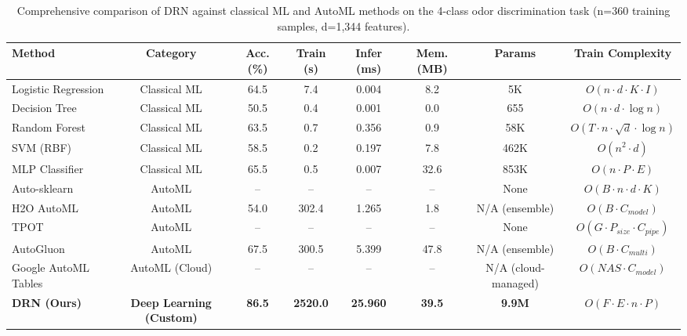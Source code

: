 \begin{table}[t]
\centering
\caption{Comprehensive comparison of DRN against classical ML and AutoML methods on the 4-class odor discrimination task (n=360 training samples, d=1,344 features).}
\label{tab:complexity}
\small
\begin{tabular}{lccccccc}
\toprule
\textbf{Method} & \textbf{Category} & \textbf{Acc. (\%)} & \textbf{Train (s)} & \textbf{Infer (ms)} & \textbf{Mem. (MB)} & \textbf{Params} & \textbf{Train Complexity} \\
\midrule
Logistic Regression & Classical ML & 64.5 & 7.4 & 0.004 & 8.2 & 5K & $O(n \cdot d \cdot K \cdot I)$ \\
Decision Tree & Classical ML & 50.5 & 0.4 & 0.001 & 0.0 & 655 & $O(n \cdot d \cdot \log n)$ \\
Random Forest & Classical ML & 63.5 & 0.7 & 0.356 & 0.9 & 58K & $O(T \cdot n \cdot \sqrt{d} \cdot \log n)$ \\
SVM (RBF) & Classical ML & 58.5 & 0.2 & 0.197 & 7.8 & 462K & $O(n^2 \cdot d)$ \\
MLP Classifier & Classical ML & 65.5 & 0.5 & 0.007 & 32.6 & 853K & $O(n \cdot P \cdot E)$ \\
\midrule
Auto-sklearn & AutoML & -- & -- & -- & -- & None & $O(B \cdot n \cdot d \cdot K)$ \\
H2O AutoML & AutoML & 54.0 & 302.4 & 1.265 & 1.8 & N/A (ensemble) & $O(B \cdot C_{model})$ \\
TPOT & AutoML & -- & -- & -- & -- & None & $O(G \cdot P_{size} \cdot C_{pipe})$ \\
AutoGluon & AutoML & 67.5 & 300.5 & 5.399 & 47.8 & N/A (ensemble) & $O(B \cdot C_{multi})$ \\
\midrule
Google AutoML Tables & AutoML (Cloud) & -- & -- & -- & -- & N/A (cloud-managed) & $O(NAS \cdot C_{model})$ \\
\midrule
\textbf{DRN (Ours)} & \textbf{Deep Learning (Custom)} & \textbf{86.5} & \textbf{2520.0} & \textbf{25.960} & \textbf{39.5} & \textbf{9.9M} & \textbf{$O(F \cdot E \cdot n \cdot P)$} \\
\bottomrule
\end{tabular}
\end{table}